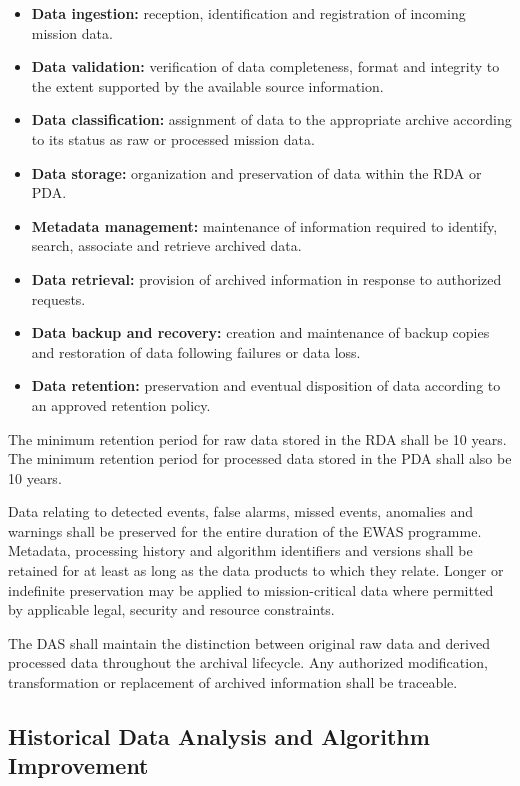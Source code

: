 \begin{itemize}
    \item \textbf{Data ingestion:} reception, identification and registration of incoming mission data.
    \item \textbf{Data validation:} verification of data completeness, format and integrity to the extent supported by the available source information.
    \item \textbf{Data classification:} assignment of data to the appropriate archive according to its status as raw or processed mission data.
    \item \textbf{Data storage:} organization and preservation of data within the RDA or PDA.
    \item \textbf{Metadata management:} maintenance of information required to identify, search, associate and retrieve archived data.
    \item \textbf{Data retrieval:} provision of archived information in response to authorized requests.
    \item \textbf{Data backup and recovery:} creation and maintenance of backup copies and restoration of data following failures or data loss.
    \item \textbf{Data retention:} preservation and eventual disposition of data according to an approved retention policy.
\end{itemize}

The minimum retention period for raw data stored in the RDA shall be 10 years. The minimum retention period for processed data stored in the PDA shall also be 10 years.

Data relating to detected events, false alarms, missed events, anomalies and warnings shall be preserved for the entire duration of the EWAS programme. Metadata, processing history and algorithm identifiers and versions shall be retained for at least as long as the data products to which they relate. Longer or indefinite preservation may be applied to mission-critical data where permitted by applicable legal, security and resource constraints.

The DAS shall maintain the distinction between original raw data and derived processed data throughout the archival lifecycle. Any authorized modification, transformation or replacement of archived information shall be traceable.

\subsection{Historical Data Analysis and Algorithm Improvement}


